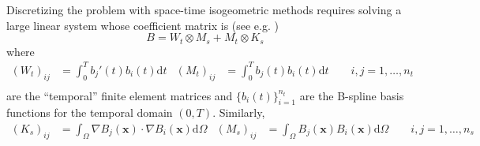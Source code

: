 \documentclass{article}
\numberwithin{equation}{section}
\theoremstyle{definition}
\begin{document}
Discretizing the problem with space-time isogeometric methods requires solving a large linear system whose coefficient matrix is (see e.g. \cite{loli2020efficient})
\begin{equation}
\label{eq: B_heat_equation}
B = W_t \otimes M_s + M_t \otimes K_s
\end{equation}
where 
\begin{align*}
    (W_t)_{ij} &= \int_0^T b_j'(t)b_i(t) \mathrm{d}t & (M_t)_{ij} &= \int_0^T b_j(t)b_i(t) \mathrm{d}t \qquad i,j=1,\dots,n_t\\
\end{align*}
are the ``temporal'' finite element matrices and $\{b_i(t)\}_{i=1}^{n_t}$ are the B-spline basis functions for the temporal domain $(0,T)$. Similarly,
\begin{align*}
    (K_s)_{ij} &= \int_\Omega \nabla B_j(\bm{x}) \cdot \nabla B_i(\bm{x}) \mathrm{d}\Omega & (M_s)_{ij} &= \int_\Omega B_j(\bm{x})B_i(\bm{x}) \mathrm{d}\Omega \qquad i,j=1,\dots,n_s\\
\end{align*}
\end{document}
